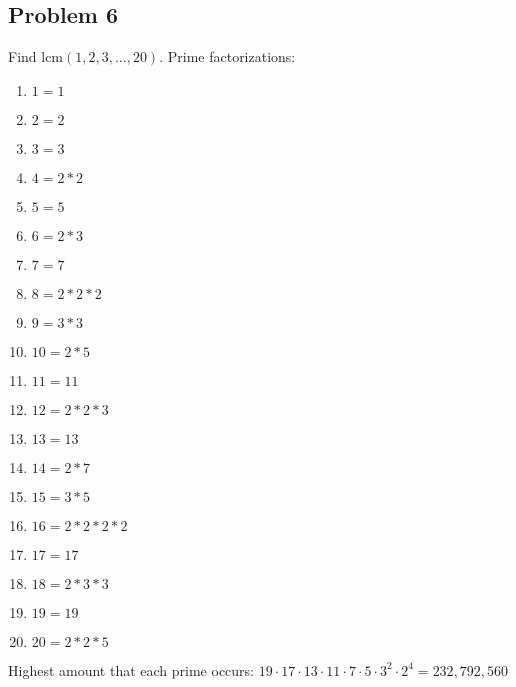 \documentclass[12pt]{article}
\begin{document}
\subsection{Problem 6}
Find lcm$(1,2,3,...,20)$.
Prime factorizations:
\begin{enumerate}
    \item $1=1$
    \item $2=2$
    \item $3=3$
    \item $4=2*2$
    \item $5=5$
    \item $6=2*3$
    \item $7=7$
    \item $8=2*2*2$
    \item $9=3*3$
    \item $10=2*5$
    \item $11=11$
    \item $12=2*2*3$
    \item $13=13$
    \item $14=2*7$
    \item $15=3*5$
    \item $16=2*2*2*2$
    \item $17=17$
    \item $18=2*3*3$
    \item $19=19$
    \item $20=2*2*5$
\end{enumerate}
Highest amount that each prime occurs: $19\cdot17\cdot13\cdot11\cdot7\cdot5\cdot3^2\cdot2^4=232,792,560$
\end{document}
